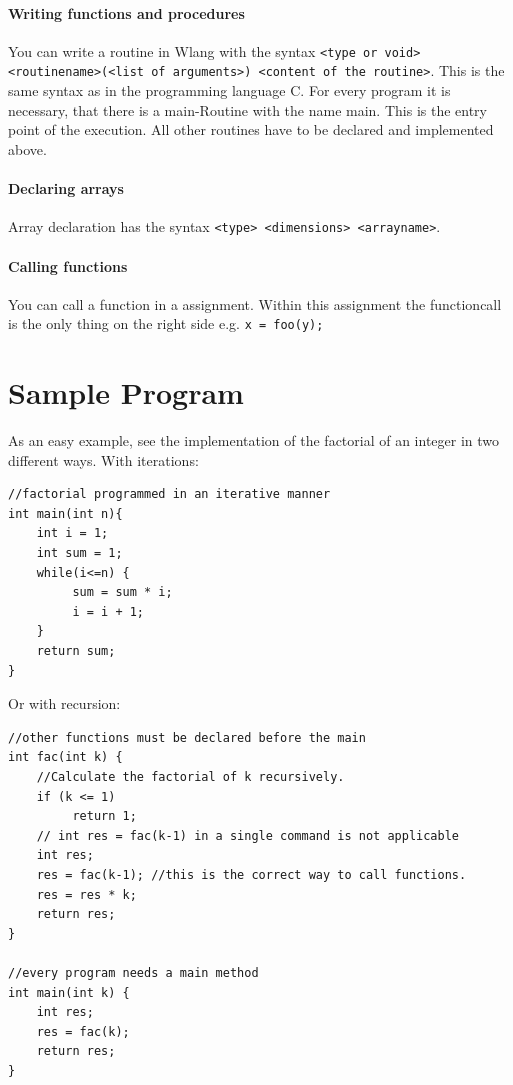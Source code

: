 \documentclass[parskip=full]{memoir}
\begin{document}
\paragraph{Writing functions and procedures}
You can write a routine in Wlang with the syntax \texttt{<type or void> <routinename>(<list of arguments>) <content of the routine>}. This is the same syntax as in the programming language C. For every program it is necessary, that there is a main-Routine with the name main. This is the entry point of the execution. All other routines have to be declared and implemented above.
\paragraph{Declaring arrays}
Array declaration has the syntax \texttt{<type> <dimensions> <arrayname>}. 
\paragraph{Calling functions}
You can call a function in a assignment. Within this assignment the functioncall is the only thing on the right side e.g. \texttt{x = foo(y);}
\section{Sample Program}
As an easy example, see the implementation of the factorial of an integer in two different ways.
With iterations:
\begin{verbatim}
//factorial programmed in an iterative manner
int main(int n){
    int i = 1;
    int sum = 1;
    while(i<=n) {
         sum = sum * i;
         i = i + 1;
    }
    return sum;
}
\end{verbatim}

Or with recursion:

\begin{verbatim}
//other functions must be declared before the main
int fac(int k) {
    //Calculate the factorial of k recursively.
    if (k <= 1)
         return 1;
    // int res = fac(k-1) in a single command is not applicable
    int res;
    res = fac(k-1); //this is the correct way to call functions.
    res = res * k;
    return res;
}

//every program needs a main method
int main(int k) {
    int res;
    res = fac(k);
    return res;
}
\end{verbatim}
\end{document}

